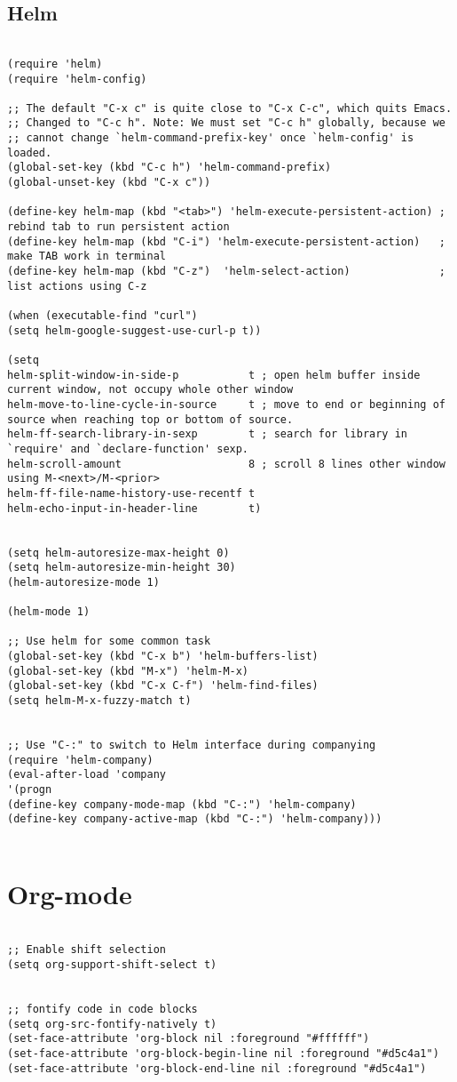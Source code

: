 \documentclass[11pt]{article}
\begin{document}
\subsection{Helm}
\label{sec:org49ddabe}
\begin{verbatim}

(require 'helm)
(require 'helm-config)

;; The default "C-x c" is quite close to "C-x C-c", which quits Emacs.
;; Changed to "C-c h". Note: We must set "C-c h" globally, because we
;; cannot change `helm-command-prefix-key' once `helm-config' is loaded.
(global-set-key (kbd "C-c h") 'helm-command-prefix)
(global-unset-key (kbd "C-x c"))

(define-key helm-map (kbd "<tab>") 'helm-execute-persistent-action) ; rebind tab to run persistent action
(define-key helm-map (kbd "C-i") 'helm-execute-persistent-action)   ; make TAB work in terminal
(define-key helm-map (kbd "C-z")  'helm-select-action)              ; list actions using C-z

(when (executable-find "curl")
(setq helm-google-suggest-use-curl-p t))

(setq 
helm-split-window-in-side-p           t ; open helm buffer inside current window, not occupy whole other window
helm-move-to-line-cycle-in-source     t ; move to end or beginning of source when reaching top or bottom of source.
helm-ff-search-library-in-sexp        t ; search for library in `require' and `declare-function' sexp.
helm-scroll-amount                    8 ; scroll 8 lines other window using M-<next>/M-<prior>
helm-ff-file-name-history-use-recentf t
helm-echo-input-in-header-line        t)


(setq helm-autoresize-max-height 0)
(setq helm-autoresize-min-height 30)
(helm-autoresize-mode 1)

(helm-mode 1)

;; Use helm for some common task
(global-set-key (kbd "C-x b") 'helm-buffers-list)
(global-set-key (kbd "M-x") 'helm-M-x)
(global-set-key (kbd "C-x C-f") 'helm-find-files)
(setq helm-M-x-fuzzy-match t)


;; Use "C-:" to switch to Helm interface during companying
(require 'helm-company)
(eval-after-load 'company
'(progn
(define-key company-mode-map (kbd "C-:") 'helm-company)
(define-key company-active-map (kbd "C-:") 'helm-company))) 


\end{verbatim}

\section{Org-mode}
\label{sec:org0ce0bbc}
\begin{verbatim}

;; Enable shift selection
(setq org-support-shift-select t)


;; fontify code in code blocks
(setq org-src-fontify-natively t)
(set-face-attribute 'org-block nil :foreground "#ffffff")
(set-face-attribute 'org-block-begin-line nil :foreground "#d5c4a1")
(set-face-attribute 'org-block-end-line nil :foreground "#d5c4a1")

\end{verbatim}
\end{document}
